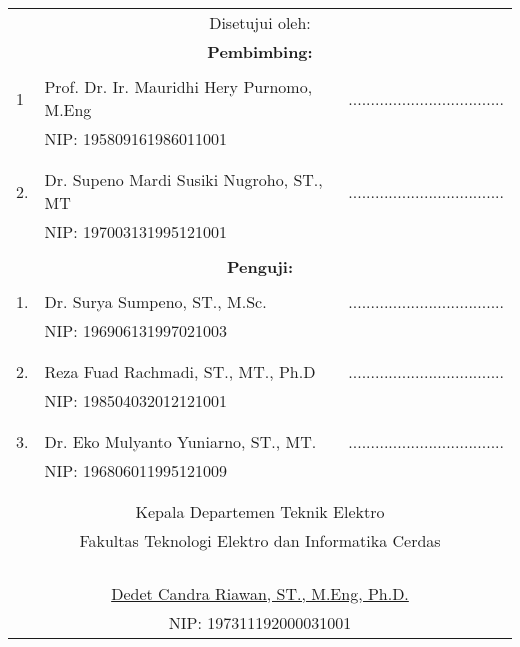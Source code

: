 \begin{table}[!h]
\centering
\vspace{-8ex}
\caption*{}
\label*{}
\begin{tabular}{lll}
	\multicolumn{3}{c}{Disetujui oleh:} \\
	\multicolumn{3}{c}{\textbf{Pembimbing:}} \\
	&  &  \\
	1 & Prof. Dr. Ir. Mauridhi Hery Purnomo, M.Eng & ................................... \\
	& NIP: 195809161986011001 &  \\
	&  &  \\
	&  &  \\
	2. & Dr. Supeno Mardi Susiki Nugroho, ST., MT & ................................... \\
	& NIP: 197003131995121001 &  \\
	&  &  \\
	\multicolumn{3}{c}{\textbf{Penguji:}} \\
	&  &  \\
	1. & Dr. Surya Sumpeno, ST., M.Sc. & ................................... \\
	& NIP: 196906131997021003 &  \\
	&  &  \\
	&  &  \\
	2. & Reza Fuad Rachmadi, ST., MT., Ph.D & ................................... \\
	& NIP: 198504032012121001 &  \\
	&  &  \\
	&  &  \\
	3. & Dr. Eko Mulyanto Yuniarno, ST., MT. & ................................... \\
	& NIP: 196806011995121009 &  \\
	&  &  \\
	&  &  \\
	\multicolumn{3}{c}{Kepala Departemen Teknik Elektro} \\
	\multicolumn{3}{c}{Fakultas Teknologi Elektro dan Informatika Cerdas} \\
	&  &  \\
	&  &  \\
	&  &  \\
	&  &  \\
	\multicolumn{3}{c}{\underline{Dedet Candra Riawan, ST., M.Eng, Ph.D.}} \\
	\multicolumn{3}{c}{NIP: 197311192000031001}
\end{tabular}
\end{table}

\newpage